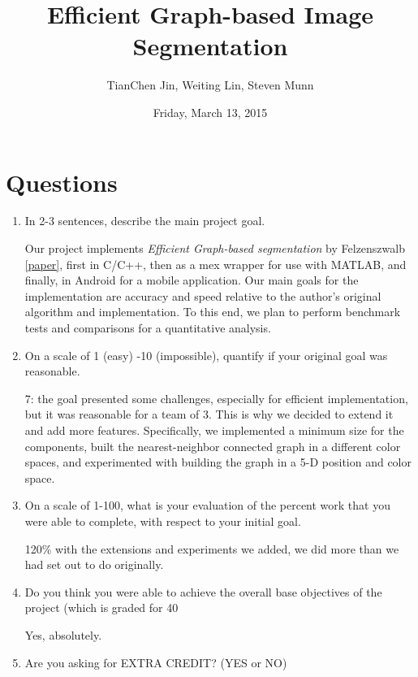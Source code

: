 \documentclass[12pt, english, titlepage]{article}
\begin{document}
\title{Efficient Graph-based Image Segmentation}

\author{TianChen Jin, Weiting Lin, Steven Munn}

\date{Friday, March 13, 2015}

\maketitle

\section{Questions}

\begin{enumerate}
\item In 2-3 sentences, describe the main project goal.

Our project implements \emph{Efficient Graph-based segmentation} by Felzenszwalb \ref{paper}, first in C/C++, then as a mex wrapper for use with MATLAB, and finally, in Android for a mobile application. Our main goals for the implementation are accuracy and speed relative to the author's original algorithm and implementation. To this end, we plan to perform benchmark tests and comparisons for a quantitative analysis.

\item On a scale of 1 (easy) -10 (impossible), quantify if your original goal was reasonable.

7: the goal presented some challenges, especially for efficient implementation, but it was reasonable for a team of 3. This is why we decided to extend it and add more features. Specifically, we implemented a minimum size for the components, built the nearest-neighbor connected graph in a different color spaces, and experimented with building the graph in a 5-D position and color space.

\item On a scale of 1-100, what is your evaluation of the percent work that you were able to complete, with respect to your initial goal.

120\% with the extensions and experiments we added, we did more than we had set out to do originally.

\item Do you think you were able to achieve the overall base objectives of the project (which is graded for 40%

Yes, absolutely.

\item Are you asking for EXTRA CREDIT?  (YES or NO)


\end{enumerate}
\end{document}
